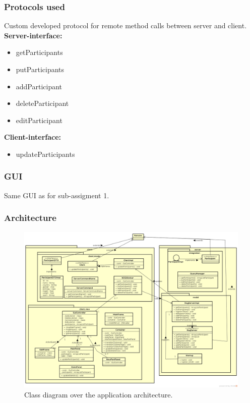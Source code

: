 \documentclass[a4paper, 11pt]{article}
\begin{document}
\subsubsection{Protocols used}
Custom developed protocol for remote method calls between server and client. \\
\textbf{Server-interface:}
\begin{itemize}
\item getParticipants
\item putParticipants
\item addParticipant
\item deleteParticipant
\item editParticipant
\end{itemize} 
\textbf{Client-interface:}
\begin{itemize}
\item updateParticipants
\end{itemize}
\subsubsection{GUI}
Same GUI as for sub-assigment 1.
\subsubsection{Architecture}
\begin{figure}[H]
\includegraphics[scale=0.30]{assignment2_architecture.png}
\caption{Class diagram over the application architecture.}
\end{figure}
\end{document}

